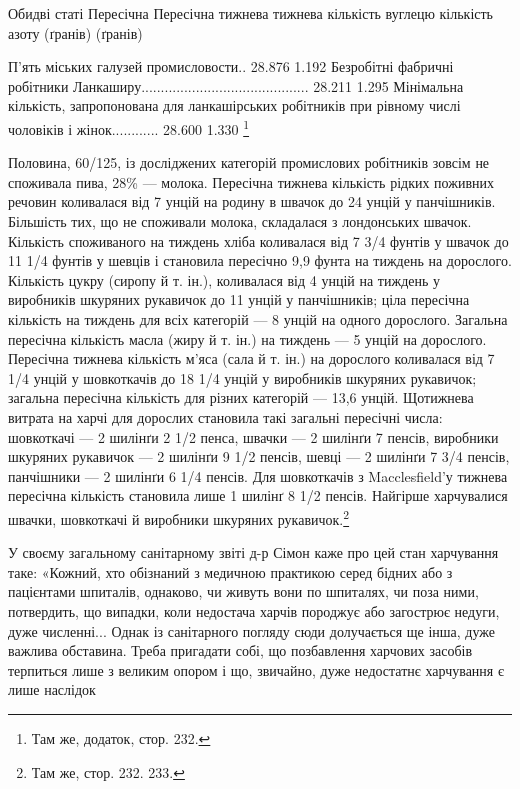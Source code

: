 \parcont{}  %
Обидві статі                                                        Пересічна                       
       Пересічна
                                                                                тижнева             
                    тижнева
                                                                                кількість вуглецю   
            кількість азоту
                                                                                (ґранів)            
                      (ґранів)

П’ять міських галузей промисловости..     28.876                                      1.192
Безробітні фабричні робітники
Ланкаширу...........................................     28.211                                     
1.295
Мінімальна кількість, запропонована
для ланкашірських робітників при
рівному числі чоловіків і жінок............      28.600                                      1.330
\footnote{
Там же, додаток, стор. 232.
}

Половина, 60/125, із досліджених категорій промислових робітників
зовсім не споживала пива, 28\% — молока. Пересічна
тижнева кількість рідких поживних речовин коливалася від
7 унцій на родину в швачок до 24 унцій у панчішників. Більшість
тих, що не споживали молока, складалася з лондонських
швачок. Кількість споживаного на тиждень хліба коливалася
від 7 3/4 фунтів у швачок до 11 1/4 фунтів у шевців і становила пересічно
9,9 фунта на тиждень на дорослого. Кількість цукру (сиропу
й т. ін.), коливалася від 4 унцій на тиждень у виробників
шкуряних рукавичок до 11 унцій у панчішників; ціла пересічна
кількість на тиждень для всіх категорій — 8 унцій на одного
дорослого. Загальна пересічна кількість масла (жиру й т. ін.)
на тиждень — 5 унцій на дорослого. Пересічна тижнева кількість
м’яса (сала й т. ін.) на дорослого коливалася від 7 1/4 унцій у шовкоткачів
до 18 1/4 унцій у виробників шкуряних рукавичок;
загальна пересічна кількість для різних категорій — 13,6 унцій.
Щотижнева витрата на харчі для дорослих становила такі загальні
пересічні числа: шовкоткачі — 2 шилінґи 2 1/2 пенса,
швачки — 2 шилінґи 7 пенсів, виробники шкуряних рукавичок
— 2 шилінґи 9 1/2 пенсів, шевці — 2 шилінґи 7 3/4 пенсів,
панчішники — 2 шилінґи 6 1/4 пенсів. Для шовкоткачів з Macclesfield’у
тижнева пересічна кількість становила лише 1 шилінґ
8 1/2 пенсів. Найгірше харчувалися швачки, шовкоткачі й виробники
шкуряних рукавичок.\footnote{
Там же, стор. 232. 233.
}

У своєму загальному санітарному звіті д-р Сімон каже про
цей стан харчування таке: «Кожний, хто обізнаний з медичною
практикою серед бідних або з пацієнтами шпиталів, однаково,
чи живуть вони по шпиталях, чи поза ними, потвердить, що випадки,
коли недостача харчів породжує або загострює недуги,
дуже численні... Однак із санітарного погляду сюди долучається
ще інша, дуже важлива обставина. Треба пригадати собі, що
позбавлення харчових засобів терпиться лише з великим опором
і що, звичайно, дуже недостатнє харчування є лише наслідок
\parbreak{}  %
